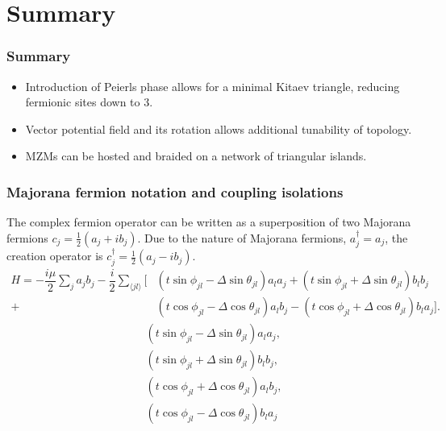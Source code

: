 \documentclass[xcolor=dvipsnames,10pt,aspectratio=169]{beamer}
\newcommand{\cc}{c^{\dagger}}
\newcommand{\de}{\Delta}
\newcommand{\CO}{Summary}
\begin{document}
  \section{\CO}
  \begin{frame}
    \frametitle{Summary}

    \begin{itemize}
      \item Introduction of Peierls phase allows for a minimal Kitaev triangle, reducing fermionic sites down to 3.
      \item Vector potential field and its rotation allows additional tunability of topology.
      \item MZMs can be hosted and braided on a network of triangular islands.
    \end{itemize}
  \end{frame}

  \appendix

  \begin{frame}
  \frametitle{Majorana fermion notation and coupling isolations}
    The complex fermion operator can be written as a superposition of two Majorana fermions $c_j = \frac{1}{2} (a_j + i b_j)$.
    Due to the nature of Majorana fermions, $a^{\dagger}_j = a_j$, the creation operator is $\cc_j = \frac{1}{2} (a_j - i b_j)$.
    \begin{align*}
      H = -\dfrac{i\mu}{2} \sum_j a_j b_j - \dfrac{i}{2} \sum_{\langle jl\rangle} [&(t\sin\phi_{jl}-\de\sin\theta_{jl}) a_l a_j + (t\sin\phi_{jl}+\de\sin\theta_{jl}) b_l b_j \nonumber \\
      +&(t\cos\phi_{jl}-\de\cos\theta_{jl}) a_l b_j - (t\cos\phi_{jl}+\de\cos\theta_{jl}) b_l a_j].
    \end{align*}
    \begin{align}
      &(t \sin\phi_{jl} - \de \sin\theta_{jl}) a_l a_j, \\
      &(t \sin\phi_{jl} + \de \sin\theta_{jl}) b_l b_j, \\
      &(t \cos\phi_{jl} + \de \cos\theta_{jl}) a_l b_j, \\
      &(t \cos\phi_{jl} - \de \cos\theta_{jl}) b_l a_j
    \end{align}
  \end{frame}
\end{document}
